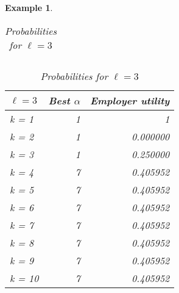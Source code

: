 \documentclass{article}
\newtheorem{example}{Example} %
\begin{document}
\begin{example}
\begin{table}[H]
\begin{minipage}{0.33\textwidth}
\begin{tabular}{lrr}
\end{tabular}
\caption{Probabilities for $\ell=2$}
\end{minipage}\hfill
\centering
\begin{minipage}{0.33\textwidth}
\small
\begin{tabular}{lrr}
\hline
$\ell=3$ & Best $\alpha$ & Employer utility \\
\hline
k = 1  &     1 &         1 \\
k = 2  &     1 &         0.000000 \\
k = 3  &     1 &         0.250000 \\
k = 4  &     7 &         0.405952 \\
k = 5  &     7 &         0.405952 \\
k = 6  &     7 &         0.405952 \\
k = 7  &     7 &         0.405952 \\
k = 8  &     7 &         0.405952 \\
k = 9  &     7 &         0.405952 \\
k = 10 &     7 &         0.405952 \\
\hline
\end{tabular}
\caption{Probabilities for $\ell=3$}
\end{minipage}\hfill
\end{table}

\begin{table}[H]
\centering
\begin{minipage}{0.33\textwidth}


\end{minipage}
\end{table}
\end{example}
\end{document}
